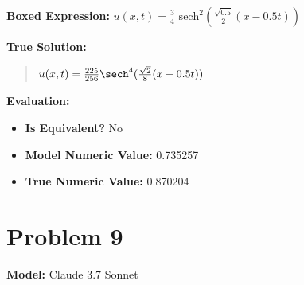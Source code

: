 \documentclass{article}
\begin{document}
\textbf{Boxed Expression:} $u(x,t) = \frac{3}{4} \text{ sech}^2\left(\frac{\sqrt{0.5}}{2}(x-0.5t)\right)$

\textbf{True Solution:}
\begin{quote}
$u(x,t) = \frac{225}{256} \sech^4( \frac{\sqrt{2}}{8} (x - 0.5t) )$
\end{quote}

\textbf{Evaluation:}
\begin{itemize}
\item \textbf{Is Equivalent?} No
\item \textbf{Model Numeric Value:} 0.735257
\item \textbf{True Numeric Value:} 0.870204
\end{itemize}
\vspace{1cm}
\section*{Problem 9}
\textbf{Model:} Claude 3.7 Sonnet
\end{document}
